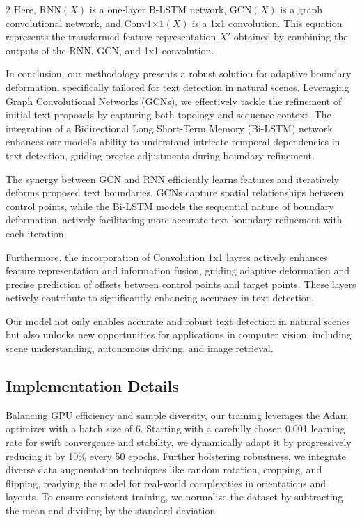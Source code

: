 \documentclass[sn-mathphys,Numbered]{sn-jnl}%
\begin{document}
\begin{multicols}{2}
Here, $\text{{RNN}}(X)$ is a one-layer B-LSTM network, $\text{{GCN}}(X)$ is a graph convolutional network, and $\text{{Conv1×1}}(X)$ is a 1x1 convolution. This equation represents the transformed feature representation $X'$ obtained by combining the outputs of the RNN, GCN, and 1x1 convolution.

In conclusion, our methodology presents a robust solution for adaptive boundary deformation, specifically tailored for text detection in natural scenes. Leveraging Graph Convolutional Networks (GCNs), we effectively tackle the refinement of initial text proposals by capturing both topology and sequence context. The integration of a Bidirectional Long Short-Term Memory (Bi-LSTM) network enhances our model's ability to understand intricate temporal dependencies in text detection, guiding precise adjustments during boundary refinement.

The synergy between GCN and RNN efficiently learns features and iteratively deforms proposed text boundaries. GCNs capture spatial relationships between control points, while the Bi-LSTM models the sequential nature of boundary deformation, actively facilitating more accurate text boundary refinement with each iteration.

Furthermore, the incorporation of Convolution 1x1 layers actively enhances feature representation and information fusion, guiding adaptive deformation and precise prediction of offsets between control points and target points. These layers actively contribute to significantly enhancing accuracy in text detection.

Our model not only enables accurate and robust text detection in natural scenes but also unlocks new opportunities for applications in computer vision, including scene understanding, autonomous driving, and image retrieval.

\subsection{Implementation Details}
Balancing GPU efficiency and sample diversity, our training leverages the Adam optimizer with a batch size of 6. Starting with a carefully chosen 0.001 learning rate for swift convergence and stability, we dynamically adapt it by progressively reducing it by 10\% every 50 epochs. Further bolstering robustness, we integrate diverse data augmentation techniques like random rotation, cropping, and flipping, readying the model for real-world complexities in orientations and layouts. To ensure consistent training, we normalize the dataset by subtracting the mean and dividing by the standard deviation.



\end{multicols}
\end{document}
